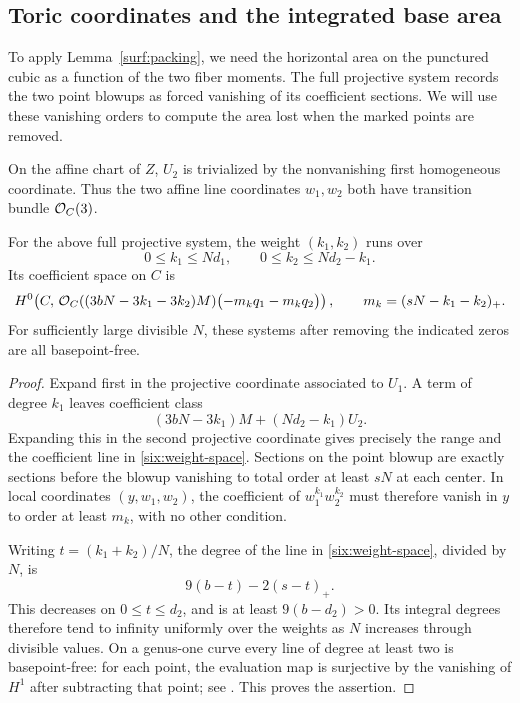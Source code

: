 \subsection{Toric coordinates and the integrated base area}

To apply Lemma~\ref{surf:packing}, we need the horizontal area on the
punctured cubic as a function of the two fiber moments.  The full
projective system records the two point blowups as forced vanishing
of its coefficient sections.  We will use these vanishing orders to
compute the area lost when the marked points are removed.

On the affine chart of \(Z\), \(U_2\) is trivialized by the nonvanishing
first homogeneous coordinate.  Thus the two affine line coordinates
\(w_1,w_2\) both have transition bundle \(\mathcal O_C(3)\).

\begin{lemma}\label{six:weights}
For the above full projective system, the weight \((k_1,k_2)\)
runs over
\[
 0\le k_1\le Nd_1,\qquad 0\le k_2\le Nd_2-k_1.
\]
Its coefficient space on \(C\) is
\begin{equation}\label{six:weight-space}
 H^0\!\left(C,\,
 \mathcal O_C((3bN-3k_1-3k_2)M)
       \bigl(-m_kq_1-m_kq_2\bigr)\right),
 \qquad m_k=(sN-k_1-k_2)_+.
\end{equation}
For sufficiently large divisible \(N\), these systems after
removing the indicated zeros are all basepoint-free.
\end{lemma}

\begin{proof}
Expand first in the projective coordinate associated to \(U_1\).
A term of degree \(k_1\) leaves coefficient class
\[
 (3bN-3k_1)M+(Nd_2-k_1)U_2.
\]
Expanding this in the second projective coordinate gives precisely
the range and the coefficient line in \eqref{six:weight-space}.
Sections on the point blowup are exactly sections before the
blowup vanishing to total order at least \(sN\) at each center.
In local coordinates \((y,w_1,w_2)\), the coefficient of
\(w_1^{k_1}w_2^{k_2}\) must therefore vanish in \(y\) to order
at least \(m_k\), with no other condition.

Writing \(t=(k_1+k_2)/N\), the degree of the line in
\eqref{six:weight-space}, divided by \(N\), is
\[
 9(b-t)-2(s-t)_+.
\]
This decreases on \(0\le t\le d_2\), and is at least
\(9(b-d_2)>0\).  Its integral degrees therefore tend to infinity
uniformly over the weights as \(N\) increases through divisible
values.  On a genus-one curve every line of degree at least two
is basepoint-free: for each point, the evaluation map is
surjective by the vanishing of \(H^1\) after subtracting that
point; see \cite[Tags~0E3B and~0E3C]{Stacks}.
This proves the assertion.
\end{proof}

